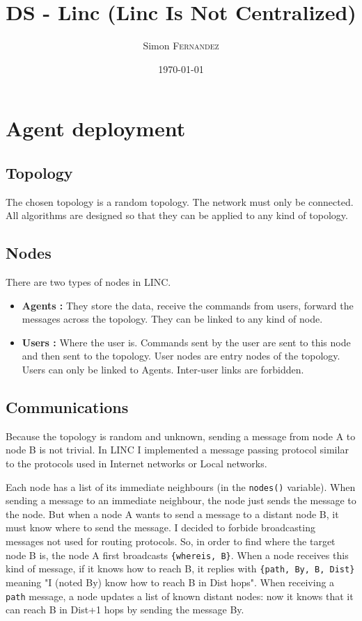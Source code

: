 \documentclass[a4paper,10pt]{report}
\title{DS - Linc (Linc Is Not Centralized)}
\author{Simon \textsc{Fernandez}}
\date{\today}
\begin{document}
\maketitle

\chapter{Agent deployment}
\section{Topology}
The chosen topology is a random topology. The network must only be 
connected. All algorithms are designed so that they can be applied to
any kind of topology. 

\section{Nodes}
There are two types of nodes in LINC.
\begin{itemize}
\item \textbf{Agents :} They store the data, receive the commands from
users, forward the messages across the topology. They can be linked to
any kind of node.
\item \textbf{Users :} Where the user is. Commands sent by the user are
sent to this node and then sent to the topology. User nodes are entry 
nodes of the topology. Users can only be linked to Agents. Inter-user
links are forbidden.
\end{itemize}

\section{Communications}
Because the topology is random and unknown, sending a message from node
A to node B is not trivial. In LINC I implemented a message passing 
protocol similar to the protocols used in Internet networks or Local 
networks. 

Each node has a list of its immediate neighbours (in the \texttt{nodes()}
variable). When sending a message to an immediate neighbour, the node
just sends the message to the node. But when a node A wants to send a 
message to a distant node B, it must know where to send the message. I 
decided to forbide broadcasting messages not used for routing protocols.
So, in order to find where the target node B is, the node A first 
broadcasts \texttt{\{whereis, B\}}. When a node receives this kind of
message, if it knows how to reach B, it replies with 
\texttt{\{path, By, B, Dist\}} meaning "I (noted By) know how to reach 
B in Dist hops".
When receiving a \texttt{path} message, a node updates a list of 
known distant nodes: now it knows that it can reach B in Dist+1 hops
by sending the message By. 
\end{document}
